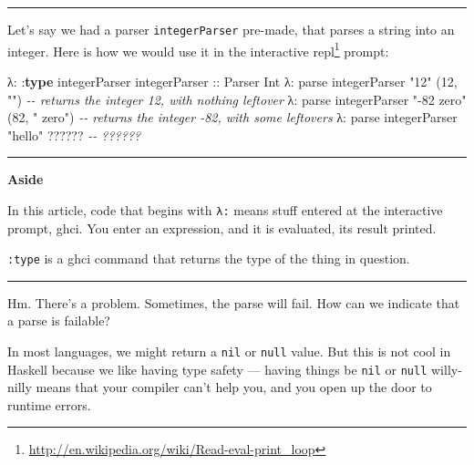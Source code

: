 \documentclass[]{article}
\newenvironment{Shaded}{}{}
\newcommand{\CommentTok}[1]{\textcolor[rgb]{0.38,0.63,0.69}{\textit{#1}}}
\newcommand{\DataTypeTok}[1]{\textcolor[rgb]{0.56,0.13,0.00}{#1}}
\newcommand{\DecValTok}[1]{\textcolor[rgb]{0.25,0.63,0.44}{#1}}
\newcommand{\KeywordTok}[1]{\textcolor[rgb]{0.00,0.44,0.13}{\textbf{#1}}}
\newcommand{\NormalTok}[1]{#1}
\newcommand{\OperatorTok}[1]{\textcolor[rgb]{0.40,0.40,0.40}{#1}}
\newcommand{\OtherTok}[1]{\textcolor[rgb]{0.00,0.44,0.13}{#1}}
\newcommand{\StringTok}[1]{\textcolor[rgb]{0.25,0.44,0.63}{#1}}
\renewcommand{\href}[2]{#2\footnote{\url{#1}}}
\begin{document}
\begin{center}\rule{0.5\linewidth}{\linethickness}\end{center}

Let's say we had a parser \texttt{integerParser} pre-made, that parses a string
into an integer. Here is how we would use it in the interactive
\href{http://en.wikipedia.org/wiki/Read-eval-print_loop}{repl} prompt:

\begin{Shaded}
\begin{Highlighting}[]
\NormalTok{λ}\OperatorTok{:} \OperatorTok{:}\KeywordTok{type}\NormalTok{ integerParser}
\OtherTok{integerParser ::} \DataTypeTok{Parser} \DataTypeTok{Int}
\NormalTok{λ}\OperatorTok{:}\NormalTok{ parse integerParser }\StringTok{"12"}
\NormalTok{(}\DecValTok{12}\NormalTok{, }\StringTok{""}\NormalTok{)                    }\CommentTok{{-}{-} returns the integer 12, with nothing leftover}
\NormalTok{λ}\OperatorTok{:}\NormalTok{ parse integerParser }\StringTok{"{-}82 zero"}
\NormalTok{(}\DecValTok{82}\NormalTok{, }\StringTok{" zero"}\NormalTok{)               }\CommentTok{{-}{-} returns the integer {-}82, with some leftovers}
\NormalTok{λ}\OperatorTok{:}\NormalTok{ parse integerParser }\StringTok{"hello"}
\OperatorTok{??????}                      \CommentTok{{-}{-} ??????}
\end{Highlighting}
\end{Shaded}

\begin{center}\rule{0.5\linewidth}{\linethickness}\end{center}

\textbf{Aside}

In this article, code that begins with \texttt{λ:} means stuff entered at the
interactive prompt, ghci. You enter an expression, and it is evaluated, its
result printed.

\texttt{:type} is a ghci command that returns the type of the thing in question.

\begin{center}\rule{0.5\linewidth}{\linethickness}\end{center}

Hm. There's a problem. Sometimes, the parse will fail. How can we indicate that
a parse is failable?

In most languages, we might return a \texttt{nil} or \texttt{null} value. But
this is not cool in Haskell because we like having type safety --- having things
be \texttt{nil} or \texttt{null} willy-nilly means that your compiler can't help
you, and you open up the door to runtime errors.
\end{document}
